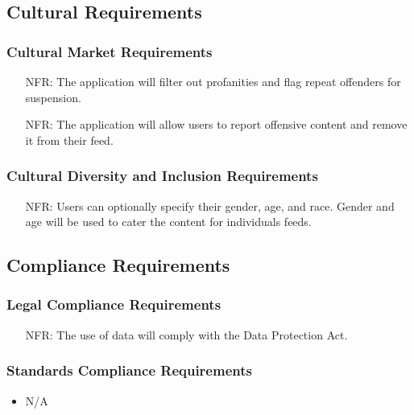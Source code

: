 \documentclass[12pt]{article}
\newcounter{nfrnum} %
\begin{document}
\subsection{Cultural Requirements}
  \subsubsection{Cultural Market Requirements}
    \noindent \begin{itemize}
      \item[NFR\refstepcounter{nfrnum}\thenfrnum:]
        The application will filter out profanities and flag repeat offenders for suspension.
      \item[NFR\refstepcounter{nfrnum}\thenfrnum:]
        The application will allow users to report offensive content and remove it from their feed.
    \end{itemize}
  \subsubsection{Cultural Diversity and Inclusion Requirements}
    \noindent \begin{itemize}
      \item[NFR\refstepcounter{nfrnum}\thenfrnum:]
        Users can optionally specify their gender, age, and race. Gender and age will be used to cater the content for individuals feeds.
    \end{itemize}

\subsection{Compliance Requirements}
  \subsubsection{Legal Compliance Requirements}
    \noindent \begin{itemize}
      \item[NFR\refstepcounter{nfrnum}\thenfrnum:]
        The use of data will comply with the Data Protection Act.
    \end{itemize}
  \subsubsection{Standards Compliance Requirements}
    \noindent \begin{itemize}
      \item N/A
    \end{itemize}
\end{document}
